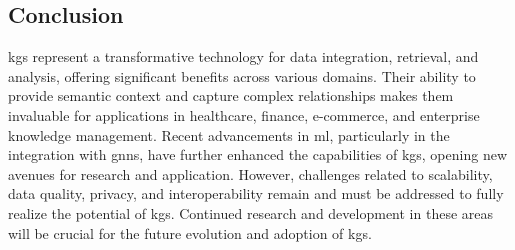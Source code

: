 \subsection*{Conclusion}
\glspl{kg} represent a transformative technology for data integration, retrieval, and analysis, offering significant benefits across various domains. Their ability to provide semantic context and capture complex relationships makes them invaluable for applications in healthcare, finance, e-commerce, and enterprise knowledge management. Recent advancements in \gls{ml}, particularly in the integration with \glspl{gnn}, have further enhanced the capabilities of \glspl{kg}, opening new avenues for research and application. However, challenges related to scalability, data quality, privacy, and interoperability remain and must be addressed to fully realize the potential of \glspl{kg}. Continued research and development in these areas will be crucial for the future evolution and adoption of \glspl{kg}.